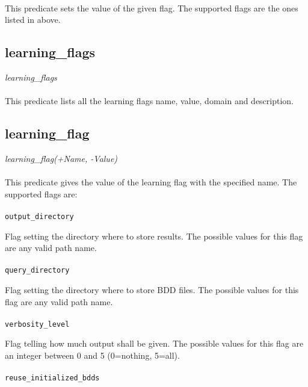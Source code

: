 \documentclass[a4paper,12pt]{article}
\begin{document}
\paragraph{}
This predicate sets the value of the given flag. The supported flags are the ones listed in above.

\subsection{learning\_flags}
\textit{learning\_flags}
\paragraph{}
This predicate lists all the learning flags name, value, domain and description.

\subsection{learning\_flag}
\textit{learning\_flag(+Name, -Value)}
\paragraph{}
This predicate gives the value of the learning flag with the specified name. The supported flags are:
\paragraph{}
\texttt{output\_directory}

Flag setting the directory where to store results.
The possible values for this flag are any valid path name.
\paragraph{}
\texttt{query\_directory}

Flag setting the directory where to store BDD files.
The possible values for this flag are any valid path name.
\paragraph{}
\texttt{verbosity\_level}

Flag telling how much output shall be given. 
The possible values for this flag are an integer between 0 and 5 (0=nothing, 5=all).
\paragraph{}
\texttt{reuse\_initialized\_bdds}
\end{document}
